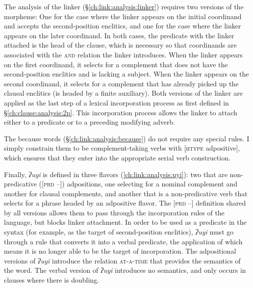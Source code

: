 The analysis of the linker (\S\ref{ch:link:analysis:linker}) requires two versions of the morpheme: One for the case where the linker appears on the initial coordinand and accepts the second-position enclitics, and one for the case where the linker appears on the later coordinand. In both cases, the predicate with the linker attached is the head of the clause, which is necessary so that coordinands are associated with the \textsc{and} relation the linker introduces. When the linker appears on the first coordinand, it selects for a complement that does not have the second-position enclitics and is lacking a subject. When the linker appears on the second coordinand, it selects for a complement that has already picked up the clausal enclitics (is headed by a finite auxiliary). Both versions of the linker are applied as the last step of a lexical incorporation process as first defined in \S\ref{ch:clause:analysis:2p}. This incorporation process allows the linker to attach either to a predicate or to a preceding modifying adverb.

The because words (\S\ref{ch:link:analysis:because}) do not require any special rules. I simply constrain them to be complement-taking verbs with [\textsc{htype} adpositive], which ensures that they enter into the appropriate serial verb construction.

Finally, \textit{ʔuyi} is defined in three flavors (\ref{ch:link:analysis:uyi}): two that are non-predicative ([\textsc{prd} --]) adpositions, one selecting for a nominal complement and another for clausal complements, and another that is a non-predicative verb that selects for a phrase headed by an adpositive flavor. The [\textsc{prd} --] definition shared by all versions allows them to pass through the incorporation rules of the language, but blocks linker attachment. In order to be used as a predicate in the syntax (for example, as the target of second-position enclitics), \textit{ʔuyi} must go through a rule that converts it into a verbal predicate, the application of which means it is no longer able to be the target of incorporation. The adpositional versions of \textit{ʔuyi} introduce the relation \textsc{at-a-time} that provides the semantics of the word. The verbal version of \textit{ʔuyi} introduces no semantics, and only occurs in clauses where there is doubling.		